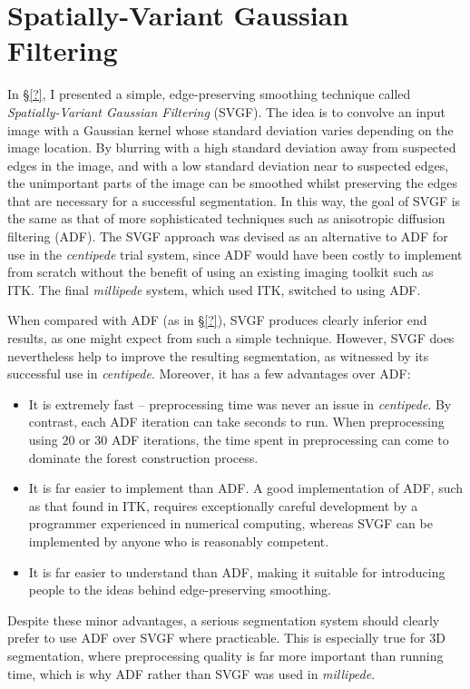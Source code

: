 \section{Spatially-Variant Gaussian Filtering}

In \S\ref{?}, I presented a simple, edge-preserving smoothing technique called \emph{Spatially-Variant Gaussian Filtering} (SVGF). The idea is to convolve an input image with a Gaussian kernel whose standard deviation varies depending on the image location. By blurring with a high standard deviation away from suspected edges in the image, and with a low standard deviation near to suspected edges, the unimportant parts of the image can be smoothed whilst preserving the edges that are necessary for a successful segmentation. In this way, the goal of SVGF is the same as that of more sophisticated techniques such as anisotropic diffusion filtering (ADF). The SVGF approach was devised as an alternative to ADF for use in the \emph{centipede} trial system, since ADF would have been costly to implement from scratch without the benefit of using an existing imaging toolkit such as ITK. The final \emph{millipede} system, which used ITK, switched to using ADF.

When compared with ADF (as in \S\ref{?}), SVGF produces clearly inferior end results, as one might expect from such a simple technique. However, SVGF does nevertheless help to improve the resulting segmentation, as witnessed by its successful use in \emph{centipede}. Moreover, it has a few advantages over ADF:
%
\begin{itemize}
\item It is extremely fast -- preprocessing time was never an issue in \emph{centipede}. By contrast, each ADF iteration can take seconds to run. When preprocessing using $20$ or $30$ ADF iterations, the time spent in preprocessing can come to dominate the forest construction process.
\item It is far easier to implement than ADF. A good implementation of ADF, such as that found in ITK, requires exceptionally careful development by a programmer experienced in numerical computing, whereas SVGF can be implemented by anyone who is reasonably competent.
\item It is far easier to understand than ADF, making it suitable for introducing people to the ideas behind edge-preserving smoothing.
\end{itemize}
%
Despite these minor advantages, a serious segmentation system should clearly prefer to use ADF over SVGF where practicable. This is especially true for 3D segmentation, where preprocessing quality is far more important than running time, which is why ADF rather than SVGF was used in \emph{millipede}.

